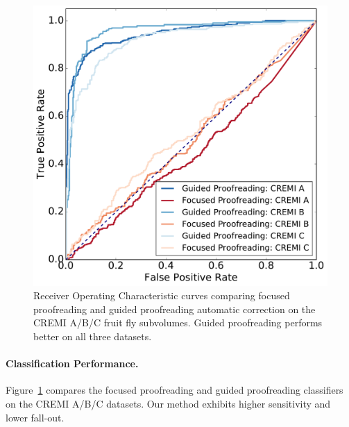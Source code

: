 \begin{figure}[t]
\centering
\includegraphics[width=\linewidth]{gfx/cremi_roc_separate_small.pdf}
\caption{Receiver Operating Characteristic curves comparing focused proofreading and guided proofreading automatic correction on the CREMI A/B/C fruit fly subvolumes. Guided proofreading performs better on all three datasets.}
\label{fig:cremi_performance}
\end{figure}

\paragraph{Classification Performance.} Figure~\ref{fig:cremi_performance} compares the  focused proofreading and guided proofreading classifiers on the CREMI A/B/C datasets. Our method exhibits higher sensitivity and lower fall-out.


